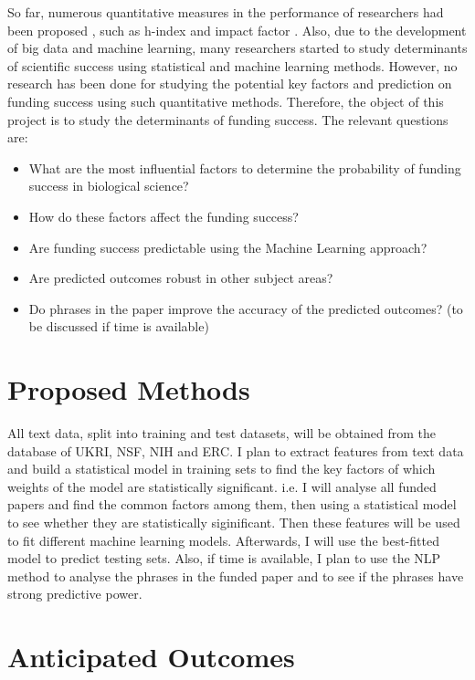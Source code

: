 \documentclass[11pt]{article}
\begin{document}
So far, numerous quantitative measures in the performance of researchers had been proposed \cite{Scientific_success}, such as h-index \cite{Hirsch16569} and impact factor \cite{VANDIJK2014R516}. Also, due to the development of big data and machine learning, many researchers started to study determinants of scientific success using statistical and machine learning methods\cite{Future_impact}\cite{Scientific_success}\cite{VANDIJK2014R516}. However, no research has been done for studying the potential key factors and prediction on funding success using such quantitative methods. Therefore, the object of this project is to study the determinants of funding success. The relevant questions are:
\begin{itemize}
    \item What are the most influential factors to determine the probability of funding success in biological science?
    \item How do these factors affect the funding success?
    \item Are funding success predictable using the Machine Learning approach?
    \item Are predicted outcomes robust in other subject areas?
    \item Do phrases in the paper improve the accuracy of the predicted outcomes? (to be discussed if time is available)
\end{itemize}

\section{Proposed Methods}

All text data, split into training and test datasets, will be obtained from the database of UKRI, NSF, NIH and ERC. I plan to extract features from text data and build a statistical model in training sets to find the key factors of which weights of the model are statistically significant. i.e. I will analyse all funded papers and find the common factors among them, then using a statistical model to see whether they are statistically siginificant. Then these features will be used to fit different machine learning models. Afterwards, I will use the best-fitted model to predict testing sets. Also, if time is available, I plan to use the NLP method to analyse the phrases in the funded paper and to see if the phrases have strong predictive power.


\section{Anticipated Outcomes}
\end{document}
